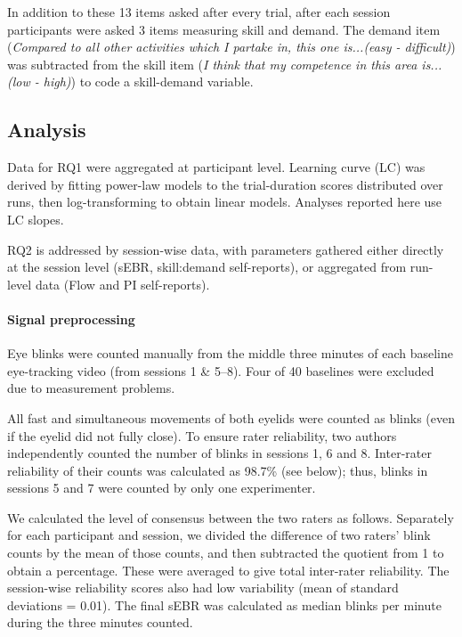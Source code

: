 \documentclass[10pt,letterpaper,floatsintext]{article}
\begin{document}
In addition to these 13 items asked after every trial, after each session participants were asked 3 items measuring skill and demand. The demand item (\textit{Compared to all other activities which I partake in, this one is...(easy - difficult)}) was subtracted from the skill item (\textit{I think that my competence in this area is...(low - high)}) to code a skill-demand variable.


\subsection*{Analysis}
Data for RQ1 were aggregated at participant level. Learning curve (LC) was derived by fitting power-law models to the trial-duration scores distributed over runs, then log-transforming to obtain linear models. Analyses reported here use LC slopes.

RQ2 is addressed by session-wise data, with parameters gathered either directly at the session level (sEBR, skill:demand self-reports), or aggregated from run-level data (Flow and PI self-reports).

\paragraph{Signal preprocessing}
Eye blinks were counted manually from the middle three minutes of each baseline eye-tracking video (from sessions 1 \& 5--8). Four of 40 baselines were excluded due to measurement problems.

All fast and simultaneous movements of both eyelids were counted as blinks (even if the eyelid did not fully close). To ensure rater reliability, two authors independently counted the number of blinks in sessions 1, 6 and 8. Inter-rater reliability of their counts was calculated as 98.7\% (see below); thus, blinks in sessions 5 and 7 were counted by only one experimenter.

We calculated the level of consensus between the two raters as follows. Separately for each participant and session, we divided the difference of two raters' blink counts by the mean of those counts, and then subtracted the quotient from 1 to obtain a percentage. These were averaged to give total inter-rater reliability. The session-wise reliability scores also had low variability (mean of standard deviations = 0.01). The final sEBR was calculated as median blinks per minute during the three minutes counted.
\end{document}
